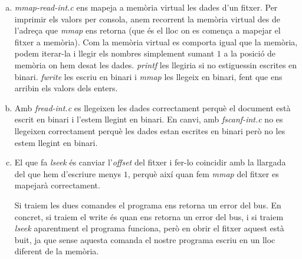 \documentclass[catalan, a4, 12pt]{article}
\begin{document}
\begin{enumerate}[(a)]
    \item \textit{mmap-read-int.c} ens mapeja a memòria virtual les dades d’un fitxer. Per imprimir els valors per consola, anem recorrent la memòria virtual des de l’adreça que \textit{mmap} ens retorna (que és el lloc on es comença a mapejar el fitxer a memòria). Com la memòria virtual es comporta igual que la memòria, podem iterar-la i llegir els nombres simplement sumant $1$ a la posició de memòria on hem desat les dades. \textit{printf} les llegiria si no estiguessin escrites en binari. \textit{fwrite} les escriu en binari i \textit{mmap} les llegeix en binari, fent que ens arribin els valors dels enters.
    
    \item Amb \textit{fread-int.c} es llegeixen les dades correctament perquè el document està escrit en binari i l'estem llegint en binari. En canvi, amb \textit{fscanf-int.c} no es llegeixen correctament perquè les dades estan escrites en binari però no les estem llegint en binari.
    
    \item El que fa \textit{lseek} és canviar l'\textit{offset} del fitxer i fer-lo coincidir amb la llargada del que hem d'escriure menys $1$, perquè així quan fem \textit{mmap} del fitxer es mapejarà correctament.
    
    Si traiem les dues comandes el programa ens retorna un error del bus. En concret, si traiem el write és quan ens retorna un error del bus, i si traiem \textit{lseek} aparentment el programa funciona, però en obrir el fitxer aquest està buit, ja que sense aquesta comanda el nostre programa escriu en un lloc diferent de la memòria.
\end{enumerate}
\end{document}
